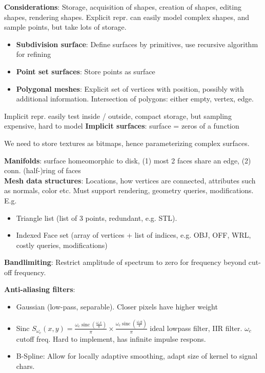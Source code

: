 
\textbf{Considerations}: Storage, acquisition of shapes, creation of shapes, editing shapes, rendering shapes. Explicit repr. can easily model complex shapes, and sample points, but take lots of storage.
\begin{itemize}[leftmargin = *,noitemsep]
\item \textbf{Subdivision surface}: Define surfaces by primitives, use recursive algorithm for refining
\item \textbf{Point set surfaces}: Store points as surface
\item \textbf{Polygonal meshes}: Explicit set of vertices with position, possibly with additional information. Intersection of polygons: either empty, vertex, edge.
\end{itemize}


Implicit repr. easily test inside / outside, compact storage, but sampling expensive, hard to model
\textbf{Implicit surfaces}: surface = zeros of a function

We need to store textures as bitmaps, hence parameterizing complex surfaces.

\textbf{Manifolds}: surface homeomorphic to disk, (1) most 2 faces share an edge, (2) conn. (half-)ring of faces\\

\textbf{Mesh data structures}: Locations, how vertices are connected, attributes such as normals, color etc. Must support rendering, geometry queries, modifications. E.g.
 \begin{itemize}[leftmargin = *,noitemsep]
\item Triangle list (list of 3 points, redundant, e.g. STL).
\item Indexed Face set (array of vertices + list of indices, e.g. OBJ, OFF, WRL, costly queries, modifications)
 \end{itemize}

\textbf{Bandlimiting}: Restrict amplitude of spectrum to zero for frequency beyond cut-off frequency.

\textbf{Anti-aliasing filters}:

\begin{itemize}[leftmargin = *,noitemsep]
\item Gaussian (low-pass, separable). Closer pixels have higher weight
\item Sinc $S_{\omega_c}(x, y)=\frac{\omega_c \operatorname{sinc}\left(\frac{\omega_c x}{\pi}\right)}{\pi} \times \frac{\omega_c \operatorname{sinc}\left(\frac{\omega_c y}{\pi}\right)}{\pi}$ ideal lowpass filter, IIR filter. $\omega_c$ cutoff freq. Hard to implement, has infinite impulse respons.
\item B-Spline: Allow for locally adaptive smoothing, adapt size of kernel to signal chars. 
\end{itemize}


